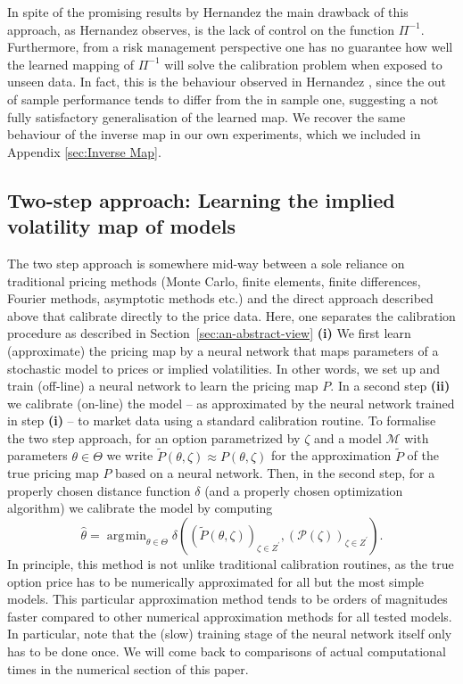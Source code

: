 \documentclass{article}
\theoremstyle{remark}
\DeclareMathOperator*{\argmin}{\arg\!\min}
\begin{document}
In spite of the promising results by Hernandez \cite{Hernandez} the main
drawback of this approach, as Hernandez observes, is the lack of control on
the function $\Pi^{-1}$. Furthermore, from a risk management
perspective one has no guarantee how well the learned mapping of
$\Pi^{-1}$ will solve the calibration problem when exposed to unseen
data. In fact, this is the behaviour observed in Hernandez \cite{Hernandez},
since the out of sample performance tends to differ from the in sample one,
suggesting a not fully satisfactory generalisation of the learned map. We
recover the same behaviour of the inverse map in our own experiments, which we
included in Appendix \ref{sec:Inverse Map}.

\subsection{Two-step approach: Learning the implied volatility map of models}
\label{sec:separation}

The two step approach is somewhere mid-way between a sole reliance on
traditional pricing methods (Monte Carlo, finite elements, finite differences,
Fourier methods, asymptotic methods etc.) and the direct approach described
above that calibrate directly to the price data. Here, one separates the
calibration procedure as described in Section~\ref{sec:an-abstract-view}
\textbf{(i)} We first learn (approximate) the pricing map by a neural network
that maps parameters of a stochastic model to prices or implied
volatilities. In other words, we set up and train (off-line) a neural network
to learn the pricing map $P$.  In a second step \textbf{(ii)} we calibrate
(on-line) the model -- as approximated by the neural network trained in step
\textbf{(i)} -- to market data using a standard calibration routine. To
formalise the two step approach, for an option parametrized by $\zeta$ and a
model $\mathcal{M}$ with parameters $\theta \in \Theta$ we write
$\widetilde{P}(\theta, \zeta) \approx P(\theta, \zeta)$ for the approximation
$\widetilde{P}$ of the true pricing map $P$ based on a neural network. Then,
in the second step, for a properly chosen distance function $\delta$ (and a
properly chosen optimization algorithm) we calibrate the model by computing
\begin{equation}\label{eq:ModelCalibration}
  \widehat{\theta} = \argmin_{\theta \in \Theta} \delta\left( \left(
      \widetilde{P}(\theta, \zeta) \right)_{\zeta \in Z^\prime}, \left(
      \mathcal{P(\zeta)} \right)_{\zeta \in Z^\prime} \right).
\end{equation}
In principle, this method is not unlike traditional calibration routines, as
the true option price has to be numerically approximated for all but the most
simple models. This particular approximation method tends to be orders of
magnitudes faster compared to other numerical approximation methods for all
tested models. In particular, note that the (slow) training stage of the
neural network itself only has to be done once. We will come back to
comparisons of actual computational times in the numerical section of this
paper. 
\end{document}
